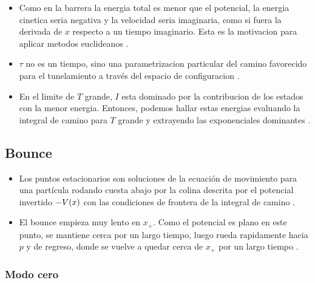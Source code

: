 \documentclass[11pt, a4paper]{article}
\numberwithin{equation}{section}
\theoremstyle{definition}
\begin{document}
\begin{itemize}

\item Como en la barrera la energia total es menor que el potencial, la energia cinetica seria negativa y la velocidad seria imaginaria, como si fuera la derivada de $x$ respecto a un tiempo imaginario. Esta es la motivacion para aplicar metodos euclideanos \cite{weinberg2012classical}.	
	
\item  $\tau$ no es un tiempo, sino una parametrizacion particular del camino favorecido para el tunelamiento a través del espacio de configuracion \cite{weinberg2012classical}. 

\item En el limite de $T$ grande,  $I$ esta dominado por la contribucion de los estados con la menor energia. Entonces, podemos hallar estas energias evaluando la integral de camino para $T$ grande y extrayendo las exponenciales dominantes \cite{weinberg2012classical}. 

\end{itemize}

\subsection{Bounce}

\begin{itemize}
	
\item Los puntos estacionarios son soluciones de la ecuación de movimiento para una partícula rodando cuesta abajo por la colina descrita por el potencial invertido $-V\qty(x)$	 con las condiciones de frontera de la integral de camino \cite{andreassen2017precision}.

\item El bounce empieza muy lento en $x_+$. Como el potencial es plano en este punto, se mantiene cerca por un largo tiempo, luego rueda rapidamente hacia $p$ y de regreso, donde se vuelve a quedar cerca de $x_+$ por un largo tiempo \cite{andreassen2017precision}. 

\end{itemize}

\subsubsection{Modo cero}
\end{document}
